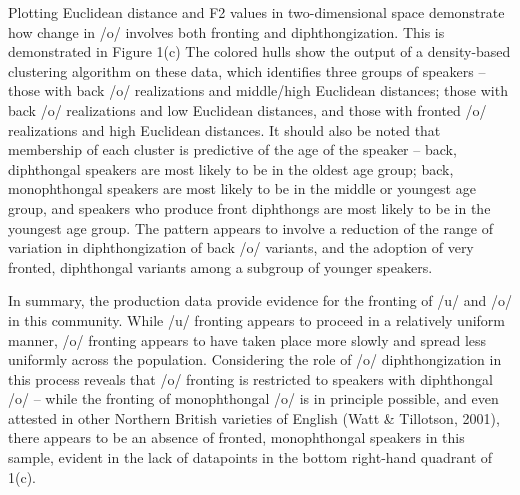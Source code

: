 \documentclass[PWPL]{article}
\begin{document}
Plotting Euclidean distance and F2 values in two-dimensional space demonstrate how change in /o/ involves both fronting and diphthongization. This is demonstrated in Figure 1(c)
The colored hulls show the output of a density-based clustering algorithm on these data, which identifies three groups of speakers -- those with back /o/ realizations and middle/high Euclidean distances; those with back /o/ realizations and low Euclidean distances, and those with fronted /o/ realizations and high Euclidean distances. It should also be noted that membership of each cluster is predictive of the age of the speaker --  back, diphthongal speakers are most likely to be in the oldest age group; back, monophthongal speakers are most likely to be in the middle or youngest age group, and speakers who produce front diphthongs are most likely to be in the youngest age group. The pattern appears to involve a reduction of the range of variation in diphthongization of back /o/ variants, and the adoption of very fronted, diphthongal variants among a subgroup of younger speakers. 

In summary, the production data provide evidence for the fronting of /u/ and /o/ in this community. While /u/ fronting appears to proceed in a relatively uniform manner, /o/ fronting appears to have taken place more slowly and spread less uniformly across the population. Considering the role of /o/ diphthongization in this process reveals that /o/ fronting is restricted to speakers with diphthongal /o/ -- while the fronting of monophthongal /o/ is in principle possible, and even attested in other Northern British varieties of English (Watt \& Tillotson, 2001), there appears to be an absence of fronted, monophthongal speakers in this sample, evident in the lack of datapoints in the bottom right-hand quadrant of 1(c).

\end{document}
